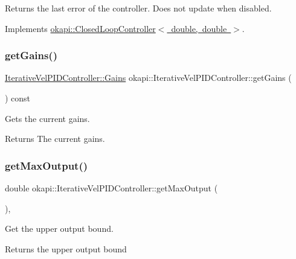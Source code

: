 Returns the last error of the controller. Does not update when disabled. 

Implements \mbox{\hyperlink{classokapi_1_1ClosedLoopController_a50c73444ff6e3e631951c43d0f951953}{okapi\+::\+Closed\+Loop\+Controller$<$ double, double $>$}}.

\mbox{\label{classokapi_1_1IterativeVelPIDController_ac3d622a0af77e60a17fe6d6351d14d4f}} 
\subsubsection{\texorpdfstring{getGains()}{getGains()}}
{\footnotesize\ttfamily \mbox{\hyperlink{structokapi_1_1IterativeVelPIDController_1_1Gains}{Iterative\+Vel\+P\+I\+D\+Controller\+::\+Gains}} okapi\+::\+Iterative\+Vel\+P\+I\+D\+Controller\+::get\+Gains (\begin{DoxyParamCaption}{ }\end{DoxyParamCaption}) const}

Gets the current gains.

\begin{DoxyReturn}{Returns}
The current gains. 
\end{DoxyReturn}
\mbox{\label{classokapi_1_1IterativeVelPIDController_acf26277c959a7fd03c918340e194a361}} 
\subsubsection{\texorpdfstring{getMaxOutput()}{getMaxOutput()}}
{\footnotesize\ttfamily double okapi\+::\+Iterative\+Vel\+P\+I\+D\+Controller\+::get\+Max\+Output (\begin{DoxyParamCaption}{ }\end{DoxyParamCaption})\hspace{0.3cm}{\ttfamily [override]}, {\ttfamily [virtual]}}

Get the upper output bound.

\begin{DoxyReturn}{Returns}
the upper output bound 
\end{DoxyReturn}


